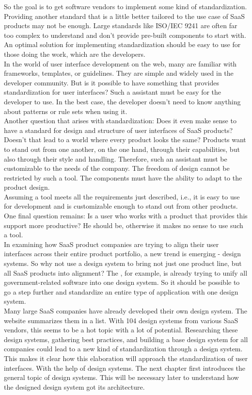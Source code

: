 So the goal is to get software vendors to implement some kind of standardization. Providing another standard that is a little better tailored to the use case of SaaS products may not be enough. Large standards like ISO/IEC 9241 are often far too complex to understand and don't provide pre-built components to start with. An optimal solution for implementing standardization should be easy to use for those doing the work, which are the developers. \\
In the world of user interface development on the web, many are familiar with frameworks, templates, or guidelines. They are simple and widely used in the developer community. But is it possible to have something that provides standardization for user interfaces? Such a assistant must be easy for the developer to use. In the best case, the developer doesn't need to know anything about patterns or rule sets when using it. \\
Another question that arises with standardization: Does it even make sense to have a standard for design and structure of user interfaces of SaaS products? Doesn't that lead to a world where every product looks the same? Products want to stand out from one another, on the one hand, through their capabilities, but also through their style and handling. Therefore, such an assistant must be customizable to the needs of the company. The freedom of design cannot be restricted by such a tool. The components must have the ability to adapt to the product design. \\
Assuming a tool meets all the requirements just described, i.e., it is easy to use for development and is customizable enough to stand out from other products. One final question remains: Is a user who works with a product that provides this support more productive? He should be, otherwise it makes no sense to use such a tool. \\

In examining how SaaS product companies are trying to align their user interfaces across their entire product portfolio, a new trend is emerging - design systems. So why not use a design system to bring not just one product line, but all SaaS products into alignment? The , for example, is already trying to unify all government-related software into one design system. So it should be possible to go a step further and standardize an entire type of application with one design system. \\
Many large SaaS companies have already developed their own design system. The  website summarizes them in a list. With 104 design systems from various SaaS vendors, this seems to be a hot topic with a lot of potential. Researching these design systems, gathering best practices, and building a base design system for all companies could lead to a new kind of standardization through a design system. \\

This makes it clear how this elaboration will approach the standardization of user interfaces. With the help of design systems. The next chapter first introduces the general topic of design systems. This will be necessary later to understand how the designed design system got its architecture.